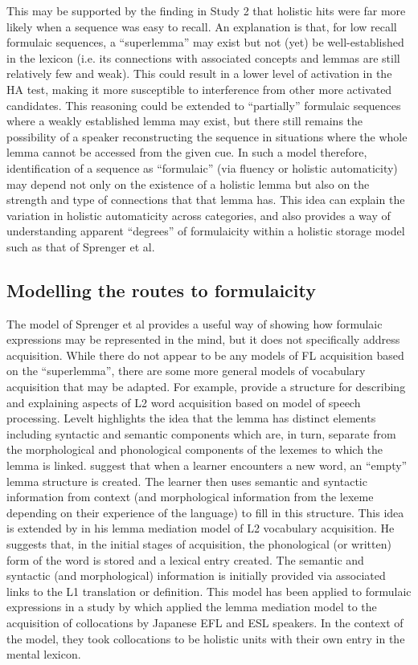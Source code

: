 \documentclass[output=paper]{langscibook}
\begin{document}
This may be supported by the finding in Study 2 that holistic hits were far more likely when a sequence was easy to recall. An explanation is that, for low recall formulaic sequences, a ``superlemma'' may exist but not (yet) be well-established in the lexicon (i.e. its connections with associated concepts and lemmas are still relatively few and weak). This could result in a lower level of activation in the HA test, making it more susceptible to interference from other more activated candidates. This reasoning could be extended to ``partially'' formulaic sequences where a weakly established lemma may exist, but there still remains the possibility of a speaker reconstructing the sequence in situations where the whole lemma cannot be accessed from the given cue. In such a model therefore, identification of a sequence as ``formulaic'' (via fluency or holistic automaticity) may depend not only on the existence of a holistic lemma but also on the strength and type of connections that that lemma has. This idea can explain the variation in holistic automaticity across categories, and also provides a way of understanding apparent ``degrees'' of formulaicity within a holistic storage model such as that of Sprenger et al. 

\subsection{Modelling the routes to formulaicity}
The model of Sprenger et al provides a useful way of showing how formulaic expressions may be represented in the mind, but it does not specifically address acquisition. While there do not appear to be any models of FL acquisition based on the ``superlemma'', there are some more general models of vocabulary acquisition that may be adapted. For example, \citet{DeBotEtAl1997} provide a structure for describing and explaining aspects of L2 word acquisition based on  model of speech processing. Levelt highlights the idea that the lemma has distinct elements including syntactic and semantic components which are, in turn, separate from the morphological and phonological components of the lexemes to which the lemma is linked. \citet{DeBotEtAl1997} suggest that when a learner encounters a new word, an ``empty'' lemma structure is created. The learner then uses semantic and syntactic information from context (and morphological information from the lexeme depending on their experience of the language) to fill in this structure. This idea is extended by \citet{Jiang2000} in his lemma mediation model of L2 vocabulary acquisition. He suggests that, in the initial stages of acquisition, the phonological (or written) form of the word is stored and a lexical entry created. The semantic and syntactic (and morphological) information is initially provided via associated links to the L1 translation or definition. This model has been applied to formulaic expressions in a study by \citet{YamashitaJiang2010} which applied the lemma mediation model to the acquisition of collocations by Japanese EFL and ESL speakers. In the context of the model, they took collocations to be holistic units with their own entry in the mental lexicon.
\end{document}
